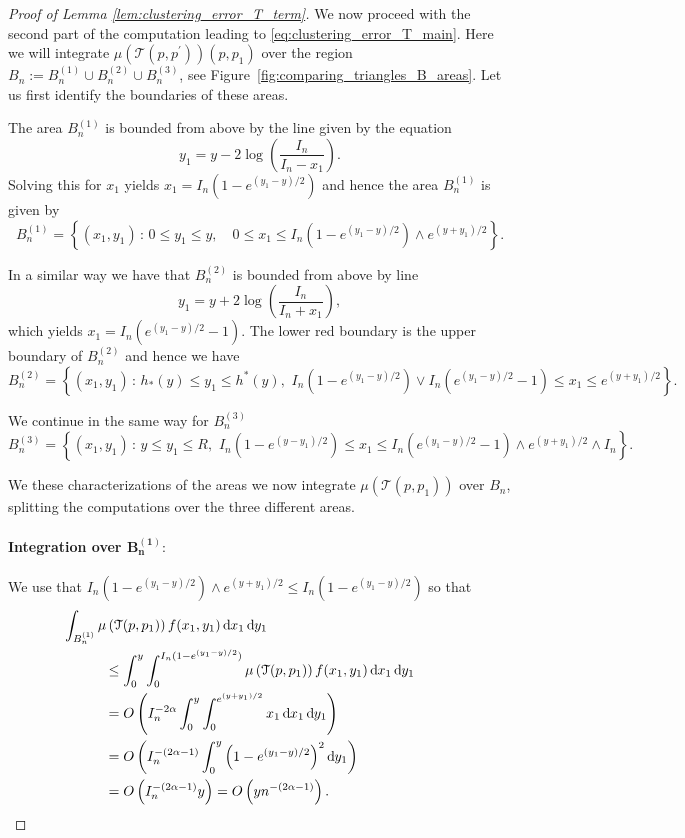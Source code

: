 \begin{proof}[Proof of Lemma \ref{lem:clustering_error_T_term}]
We now proceed with the second part of the computation leading to \eqref{eq:clustering_error_T_main}. Here we will integrate $\mu(\mathcal{T}(p,p^\prime))(p,p_1)$ over the region $B_n := B_n^{(1)} \cup B_n^{(2)} \cup B_n^{(3)}$, see Figure~\ref{fig:comparing_triangles_B_areas}. Let us first identify the boundaries of these areas. 

The area $B_n^{(1)}$ is bounded from above by the line given by the equation
\[
	y_1 = y - 2\log\left(\frac{I_n}{I_n - x_1}\right).
\]
Solving this for $x_1$ yields $x_1 = I_n\left(1 - e^{(y_1-y)/2}\right)$ and hence the area $B_n^{(1)}$ is given by
\[
	B_n^{(1)} = \left\{(x_1, y_1) \, : \, 0 \le y_1 \le y, \quad 0 \le x_1 \le I_n\left(1 - e^{(y_1-y)/2}\right) \wedge e^{(y + y_1)/2} \right\}.
\]

In a similar way we have that $B_n^{(2)}$ is bounded from above by line
\[
	y_1 = y + 2\log\left(\frac{I_n}{I_n + x_1}\right),
\]
which yields $x_1 = I_n\left(e^{(y_1 - y)/2} - 1\right)$. The lower red boundary is the upper boundary of $B_n^{(2)}$ and hence we have
\[
	B_n^{(2)} = \left\{(x_1, y_1) \, : \, h_\ast(y) \le y_1 \le h^\ast(y), \,\, I_n\left(1 - e^{(y_1-y)/2}\right) \vee 
	I_n\left(e^{(y_1 - y)/2} - 1\right) \le x_1 \le e^{(y + y_1)/2} \right\}.
\]

We continue in the same way for $B_n^{(3)}$
\[
	B_n^{(3)} = \left\{(x_1, y_1) \, : \, y \le y_1 \le R, \,\,
	I_n\left(1 - e^{(y - y_1)/2}\right) \le x_1 \le I_n\left(e^{(y_1 - y)/2} - 1\right) \wedge e^{(y + y_1)/2} \wedge I_n \right\}.
\]

We these characterizations of the areas we now integrate $\mu(\mathcal{T}(p,p_1))$ over $B_n$, splitting the computations over the three different areas.

\paragraph{Integration over $\bm{B_n^{(1)}}:$}

We use that $I_n\left(1 - e^{(y_1-y)/2}\right) \wedge e^{(y + y_1)/2} \le I_n\left(1 - e^{(y_1-y)/2}\right)$ so that
\begin{align*}
	&\hspace{-30pt}\int_{B_n^{(1)}} \mu\left(\mathcal{T}(p,p_1)\right) 
		f(x_1,y_1)	\dd x_1 \dd y_1 \\
	&\le  \int_0^y \int_0^{I_n(1-e^{(y_1-y)/2})} \mu\left(\mathcal{T}(p,p_1)\right) 
		f(x_1,y_1) \dd x_1 \dd y_1\\
	&= \bigO{ I_n^{-2\alpha} \int_0^y \int_0^{e^{(y+y_1)/2}}  x_1 \dd x_1 \dd y_1 }\\
	&= \bigO{I_n^{-(2\alpha-1)} \int_0^y \left(1 - e^{(y_1-y)/2}\right)^2 \dd y_1} \\
	&= \bigO{I_n^{-(2\alpha - 1)} y} = \bigO{y n^{-(2\alpha - 1)}}.
\end{align*} 


\end{proof}
